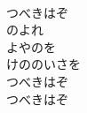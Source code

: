 \documentclass[10pt,b5j]{tarticle} %
\begin{document}
\begin{enumerate}
\begin{minipage}[c]{\blocksize}
    \end{minipage}
    \begin{minipage}[c]{\blocksize}
        
        \vspace{\linespace}
        \item~\\
        つべきはぞ\\
        のよれ\\
        よやのを\\
        けののいさを\\
        つべきはぞ\\
        つべきはぞ
    
    \end{minipage}
\end{enumerate} %
\end{document}
